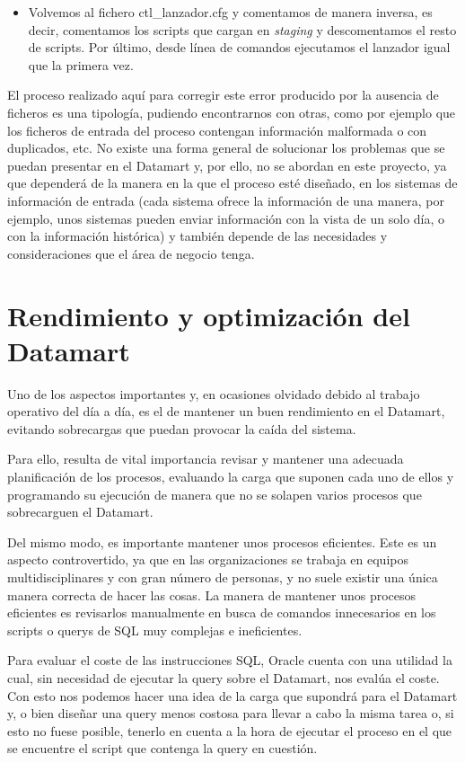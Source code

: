 \documentclass[a4paper, 12pt]{book}
\begin{document}
\begin{enumerate}
\begin{itemize}
	\item Volvemos al fichero ctl\_lanzador.cfg y comentamos de manera inversa, es decir, comentamos los scripts que cargan en \textit{staging} y descomentamos el resto de scripts. Por último, desde línea de comandos ejecutamos el lanzador igual que la primera vez.
\end{itemize}
El proceso realizado aquí para corregir este error producido por la ausencia de ficheros es una tipología, pudiendo encontrarnos con otras, como por ejemplo que los ficheros de entrada del proceso contengan información malformada o con duplicados, etc. No existe una forma general de solucionar los problemas que se puedan presentar en el Datamart y, por ello, no se abordan en este proyecto, ya que dependerá de la manera en la que el proceso esté diseñado, en los sistemas de información de entrada (cada sistema ofrece la información de una manera, por ejemplo, unos sistemas pueden enviar información con la vista de un solo día, o con la información histórica) y también depende de las necesidades y consideraciones que el área de negocio tenga. 

\section{Rendimiento y optimización del Datamart} 
\label{sec:rendimiento}
Uno de los aspectos importantes y, en ocasiones olvidado debido al trabajo operativo del día a día, es el de mantener un buen rendimiento en el Datamart, evitando sobrecargas que puedan provocar la caída del sistema.

Para ello, resulta de vital importancia revisar y mantener una adecuada planificación de los procesos, evaluando la carga que suponen cada uno de ellos y programando su ejecución de manera que no se solapen varios procesos que sobrecarguen el Datamart.

Del mismo modo, es importante mantener unos procesos eficientes. Este es un aspecto controvertido, ya que en las organizaciones se trabaja en equipos multidisciplinares y con gran número de personas, y no suele existir una única manera correcta de hacer las cosas. La manera de mantener unos procesos eficientes es revisarlos manualmente en busca de comandos innecesarios en los scripts o querys de SQL muy complejas e ineficientes.

Para evaluar el coste de las instrucciones SQL, Oracle cuenta con una utilidad la cual, sin necesidad de ejecutar la query sobre el Datamart, nos evalúa el coste. Con esto nos podemos hacer una idea de la carga que supondrá para el Datamart y, o bien diseñar una query menos costosa para llevar a cabo la misma tarea o, si esto no fuese posible, tenerlo en cuenta a la hora de ejecutar el proceso en el que se encuentre el script que contenga la query en cuestión.
\end{enumerate}
\end{document}
